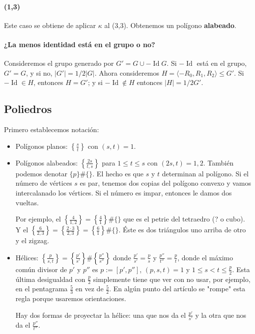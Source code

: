 \documentclass[spanish]{article}
\theoremstyle{definition}
\DeclareMathOperator{\Id}{Id}
\begin{document}
\paragraph{\textbf{(1,3)}} Este caso se obtiene de aplicar $\kappa$ al (3,3). Obtenemos un polígono \textbf{alabeado}.

\paragraph{¿La menos identidad está en el grupo o no?}
Consideremos el grupo generado por $G'=G\cup -\Id G$. Si $-\Id$ está en el grupo, $G'=G$, y si no, $|G'|=1/2|G|$. Ahora consideremos $H=\langle -R_0,R_1,R_2\rangle\leq G'$. Si $-\Id\in H$, entonces $H=G'$; y si $-\Id\notin H$ entonces $|H|=1/2G'$.

\subsection{Poliedros}
Primero establecemos notación:
\begin{itemize}
	\item Polígonos planos: $\left\{\frac{s}{t}\right\}$ con $(s,t)=1$.
	\item Polígonos alabeados: $\left\{\frac{2s}{t,s}\right\}$ para $1\leq t\leq s$ con $(2s,t)=1,2$. También podemos denotar $\{p\}\#\{\}$. El hecho es que $s$ y $t$ determinan al polígono. Si el número de vértices $s$ es par, tenemos dos copias del polígono convexo y vamos intercalanado los vértices. Si el número es impar, entonces le damos dos vueltas.
	
	Por ejemplo, el $\left\{\frac{4}{1,2}\right\}=\left\{\frac{4}{1}\right\}\#\{\}$ que es el petrie del tetraedro (? o cubo). Y el $\left\{\frac{6}{2,3}\right\}=\left\{\frac{2\cdot3}{2,3}\right\}=\left\{\frac{6}{1}\right\}\#\{\}$. Éste es dos triángulos uno arriba de otro y el zigzag.
	
	\item Hélices: $\left\{\frac{p}{s,t}\right\}=\left\{\frac{p'}{s'}\right\}\#\left\{\frac{p''}{s''}\right\}$ donde $\frac{p'}{s'}=\frac{p}{s}$ y $\frac{p''}{t''}=\frac{p}{t}$, donde el máximo común divisor de $p'$ y $p''$ es $p:=[p',p'']$, $(p,s,t)=1$ y $1\leq s<t\leq\frac{p}{2}$. Esta última desigualdad con $\frac{p}{2}$ simplemente tiene que ver con no usar, por ejemplo, en el pentagrama $\frac{5}{3}$ en vez de $\frac{5}{2}$. En algún punto del artículo se "rompe" esta regla porque usaremos orientaciones.
	
	Hay dos formas de proyectar la hélice: una que nos da el $\frac{p'}{s'}$ y la otra que nos da el $\frac{p''}{t''}$.
\end{itemize}
\end{document}
